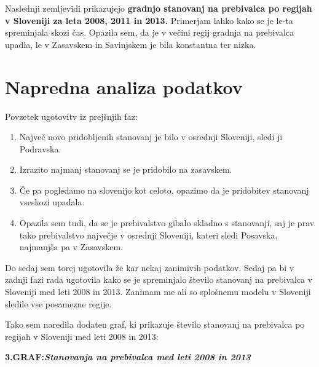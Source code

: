 \documentclass[11pt,a4paper]{article}
\begin{document}
Naslednji zemljevidi prikazujejo \textbf{gradnjo stanovanj na prebivalca po regijah v Sloveniji za leta 2008, 2011 in 2013.} Primerjam lahko kako se je le-ta spreminjala skozi čas. Opazila sem, da je v večini regij gradnja na prebivalca upadla, le v Zasavskem in Savinjskem je bila konstantna ter nizka.
\bigskip


\newpage
\section{Napredna analiza podatkov}

Povzetek ugotovitv iz prejšnjih faz:
\begin{enumerate} 
\item{Največ novo pridobljenih stanovanj je bilo v osrednji Sloveniji, sledi ji Podravska.}
\item{Izrazito najmanj stanovanj se je pridobilo na zasavskem.}
\item{Če pa pogledamo na slovenijo kot celoto, opazimo da je pridobitev stanovanj vseskozi upadala.}
\item{Opazila sem tudi, da se je prebivalstvo gibalo skladno s stanovanji, saj je prav tako prebivalstvo največje v osrednji Sloveniji, kateri sledi Posavska, najmanjša pa v Zasavskem.}
\end{enumerate}

Do sedaj sem torej ugotovila že kar nekaj zanimivih podatkov. Sedaj pa bi v zadnji fazi rada ugotovila kako se je spreminjalo število stanovanj na prebivalca v Sloveniji med leti 2008 in 2013. Zanimam me ali so splošnemu modelu v Sloveniji sledile vse posamezne regije.

\newpage
Tako sem naredila dodaten graf, ki prikazuje število stanovanj na prebivalca po regijah v Sloveniji med leti 2008 in 2013:
\newline

\textbf{3.GRAF:\emph{Stanovanja na prebivalca med leti 2008 in 2013}}\\
\newline
{}
\end{document}
